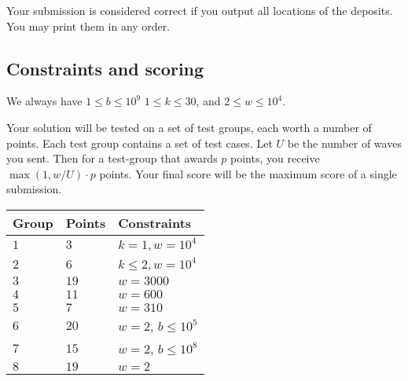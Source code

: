 Your submission is considered correct if you output all locations of the deposits.
You may print them in any order.

\subsection*{Constraints and scoring}

We always have 
$1\leq b \leq 10^9$ %
$1 \leq k \leq 30$, %
and
$2 \le w \le 10^4$. %

Your solution will be tested on a set of test groups, each worth a number of points.
Each test group contains a set of test cases.
Let $U$ be the number of waves you sent. 
Then for a test-group that awards $p$ points, you receive $\max(1,w/U)\cdot p$ points.
Your final score will be the maximum score of a single submission.

\medskip
\begin{tabular}{lll}
Group & Points & Constraints \\\hline
  $1$ & $3$ & $k = 1, w = 10^4$\\
  $2$ & $6$ & $k \le 2, w = 10^4$\\
  $3$ & $19$ & $w = 3000$\\
  $4$ & $11$ & $w = 600$\\
  $5$ & $7$ & $w = 310$\\
  $6$ & $20$ & $w = 2$, $b \le 10^5$\\
  $7$ & $15$ & $w = 2$, $b \le 10^8$\\
  $8$ & $19$ & $w = 2$
\end{tabular}

